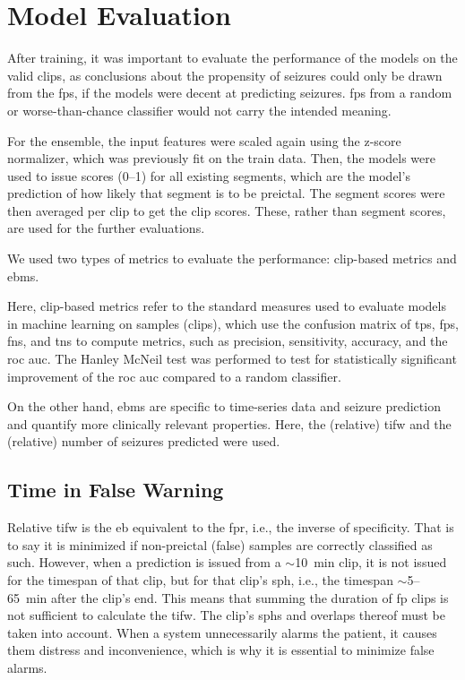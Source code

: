 

\section{Model Evaluation} \label{sec:model-evaluation}
After training, it was important to evaluate the performance of the models on the valid clips, as conclusions about the propensity of seizures could only be drawn from the \glspl{fp}, if the models were decent at predicting seizures.
\glspl{fp} from a random or worse-than-chance classifier would not carry the intended meaning.

For the ensemble, the input features were scaled again using the z-score normalizer, which was previously fit on the train data.
Then, the models were used to issue scores (0--1) for all existing segments, which are the model's prediction of how likely that segment is to be preictal.
The segment scores were then averaged per clip to get the clip scores.
These, rather than segment scores, are used for the further evaluations.

We used two types of metrics to evaluate the performance: clip-based metrics and \glspl{ebm}.

Here, clip-based metrics refer to the standard measures used to evaluate models in machine learning on samples (clips), which use the confusion matrix of \glspl{tp}, \glspl{fp}, \glspl{fn}, and \glspl{tn} to compute metrics, such as precision, sensitivity, accuracy, and the \gls{roc auc}.
The Hanley McNeil test was performed to test for statistically significant improvement of the \gls{roc auc} compared to a random classifier.

On the other hand, \glspl{ebm} are specific to time-series data and seizure prediction and quantify more clinically relevant properties.
Here, the (relative) \gls{tifw} \parencite{mormann_seizure_2007, eberlein_machine_2025} and the (relative) number of seizures predicted were used.

\subsection{Time in False Warning} \label{subsec:tifw}
Relative \gls{tifw} is the \gls{eb} equivalent to the \gls{fpr}, i.e., the inverse of specificity.
That is to say it is minimized if non-preictal (false) samples are correctly classified as such.
However, when a prediction is issued from a $\sim$\SI{10}{\minute} clip, it is not issued for the timespan of that clip, but for that clip's \gls{sph}, i.e., the timespan $\sim$\num{5}--\SI{65}{\minute} after the clip's end.
This means that summing the duration of \gls{fp} clips is not sufficient to calculate the \gls{tifw}.
The clip's \glspl{sph} and overlaps thereof must be taken into account.
When a system unnecessarily alarms the patient, it causes them distress and inconvenience, which is why it is essential to minimize false alarms. %

